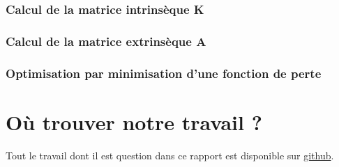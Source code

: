 \documentclass[12pt]{article}
\begin{document}
\subsubsection{Calcul de la matrice intrinsèque K}

\subsubsection{Calcul de la matrice extrinsèque A}

\subsubsection{Optimisation par minimisation d'une fonction de perte}

\newpage

\section{Où trouver notre travail ?}

Tout le travail dont il est question dans ce rapport est disponible sur \href{https://github.com/antoinedenovembre/3d_reconstruction}{github}.

\newpage

\newpage
\renewcommand{\refname}{Bibliographie}



\end{document}
